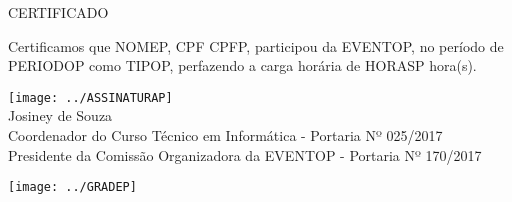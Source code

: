 \documentclass{abnt}
\begin{document}
\BgThispage
\color{CONF_COR}
\bf
\begin{center}
    \Huge{CERTIFICADO}
\end{center}

Certificamos que NOMEP, CPF CPFP, participou da EVENTOP, no período de
PERIODOP como TIPOP, perfazendo a carga horária de HORASP hora(s).


\begin{center}
\texttt{[image: ../ASSINATURAP]}\\
Josiney de Souza\\
Coordenador do Curso Técnico em Informática - Portaria Nº 025/2017\\
Presidente da Comissão Organizadora da EVENTOP - Portaria Nº 170/2017
\end{center}

\newpage
{}

\texttt{[image: ../GRADEP]}
\end{document}
